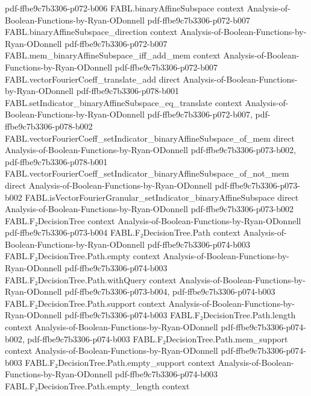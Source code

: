 \begin{theorem}
{    pdf-ffbe9c7b3306-p072-b006}
\proofstep
  {FABL.binaryAffineSubspace}
  {context}
  {Analysis-of-Boolean-Functions-by-Ryan-ODonnell}
  {pdf-ffbe9c7b3306-p072-b007}
\proofstep
  {FABL.binaryAffineSubspace_direction}
  {context}
  {Analysis-of-Boolean-Functions-by-Ryan-ODonnell}
  {pdf-ffbe9c7b3306-p072-b007}
\proofstep
  {FABL.mem_binaryAffineSubspace_iff_add_mem}
  {context}
  {Analysis-of-Boolean-Functions-by-Ryan-ODonnell}
  {pdf-ffbe9c7b3306-p072-b007}
\proofstep
  {FABL.vectorFourierCoeff_translate_add}
  {direct}
  {Analysis-of-Boolean-Functions-by-Ryan-ODonnell}
  {pdf-ffbe9c7b3306-p078-b001}
\proofstep
  {FABL.setIndicator_binaryAffineSubspace_eq_translate}
  {context}
  {Analysis-of-Boolean-Functions-by-Ryan-ODonnell}
  {pdf-ffbe9c7b3306-p072-b007,
    pdf-ffbe9c7b3306-p078-b002}
\proofstep
  {FABL.vectorFourierCoeff_setIndicator_binaryAffineSubspace_of_mem}
  {direct}
  {Analysis-of-Boolean-Functions-by-Ryan-ODonnell}
  {pdf-ffbe9c7b3306-p073-b002,
    pdf-ffbe9c7b3306-p078-b001}
\proofstep
  {FABL.vectorFourierCoeff_setIndicator_binaryAffineSubspace_of_not_mem}
  {direct}
  {Analysis-of-Boolean-Functions-by-Ryan-ODonnell}
  {pdf-ffbe9c7b3306-p073-b002}
\proofstep
  {FABL.isVectorFourierGranular_setIndicator_binaryAffineSubspace}
  {direct}
  {Analysis-of-Boolean-Functions-by-Ryan-ODonnell}
  {pdf-ffbe9c7b3306-p073-b002}
\proofstep
  {FABL.F₂DecisionTree}
  {context}
  {Analysis-of-Boolean-Functions-by-Ryan-ODonnell}
  {pdf-ffbe9c7b3306-p073-b004}
\proofstep
  {FABL.F₂DecisionTree.Path}
  {context}
  {Analysis-of-Boolean-Functions-by-Ryan-ODonnell}
  {pdf-ffbe9c7b3306-p074-b003}
\proofstep
  {FABL.F₂DecisionTree.Path.empty}
  {context}
  {Analysis-of-Boolean-Functions-by-Ryan-ODonnell}
  {pdf-ffbe9c7b3306-p074-b003}
\proofstep
  {FABL.F₂DecisionTree.Path.withQuery}
  {context}
  {Analysis-of-Boolean-Functions-by-Ryan-ODonnell}
  {pdf-ffbe9c7b3306-p073-b004,
    pdf-ffbe9c7b3306-p074-b003}
\proofstep
  {FABL.F₂DecisionTree.Path.support}
  {context}
  {Analysis-of-Boolean-Functions-by-Ryan-ODonnell}
  {pdf-ffbe9c7b3306-p074-b003}
\proofstep
  {FABL.F₂DecisionTree.Path.length}
  {context}
  {Analysis-of-Boolean-Functions-by-Ryan-ODonnell}
  {pdf-ffbe9c7b3306-p074-b002,
    pdf-ffbe9c7b3306-p074-b003}
\proofstep
  {FABL.F₂DecisionTree.Path.mem_support}
  {context}
  {Analysis-of-Boolean-Functions-by-Ryan-ODonnell}
  {pdf-ffbe9c7b3306-p074-b003}
\proofstep
  {FABL.F₂DecisionTree.Path.empty_support}
  {context}
  {Analysis-of-Boolean-Functions-by-Ryan-ODonnell}
  {pdf-ffbe9c7b3306-p074-b003}
\proofstep
  {FABL.F₂DecisionTree.Path.empty_length}
  {context}

\end{theorem}
